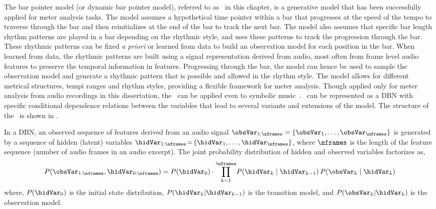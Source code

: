 The bar pointer model (or dynamic bar pointer model), referred to as \bpmodel\ in this chapter, is a generative model that has been successfully applied for meter analysis tasks. The model assumes a hypothetical time pointer within a bar that progresses at the speed of the tempo to traverse through the bar and then reinitializes at the end of the bar to track the next bar. The model also assumes that specific bar length rhythm patterns are played in a bar depending on the rhythmic style, and uses these patterns to track the progression through the bar. These rhythmic patterns can be fixed \textit{a priori} or learned from data to build an observation model for each position in the bar. When learned from data, the rhythmic patterns are built using a signal representation derived from audio, most often from frame level audio features to preserve the temporal information in features. Progressing through the bar, the model can hence be used to sample the observation model and generate a rhythmic pattern that is possible and allowed in the rhythm style. The model allows for different metrical structures, tempi ranges and rhythm styles, providing a flexible framework for meter analysis. Though applied only for meter analysis from audio recordings in this dissertation, the \bpmodel\ can be applied even to symbolic music~\cite{whiteley:06:ismir}. \bpmodel\ can be represented as a \gls{DBN} with specific conditional dependence relations between the variables that lead to several variants and extensions of the model. The structure of the \bpmodel\ is shown in .

In a \gls{DBN}, an observed sequence of features derived from an audio signal $\obsVar_{1:\nframes} = \{\obsVar_1, \ldots, \obsVar_\nframes\}$ is generated by a sequence of hidden (latent) variables $\hidVar_{1:\nframes} \!=\! \{\hidVar_1, \ldots, \hidVar_\nframes\}$, where $\nframes$ is the length of the feature sequence (number of audio frames in an audio excerpt). The joint probability distribution of hidden and observed variables factorizes as, 
\begin{equation}
P(\obsVar_{1:\nframes},\hidVar_{0:\nframes}) = P(\hidVar_{0}) \cdot \overset{\nframes}{\underset{k=1}{\prod}}  P(\hidVar_{k} \mid \hidVar_{k-1})\,P(\obsVar_{k} \mid \hidVar_{k}) \label{eqn:dbn:basic}
\end{equation}
where, $P(\hidVar_{0})$ is the initial state distribution, $P(\hidVar_{k} | \hidVar_{k-1})$ is the transition model, and $P(\obsVar_{k} | \hidVar_{k})$ is the observation model.
%
